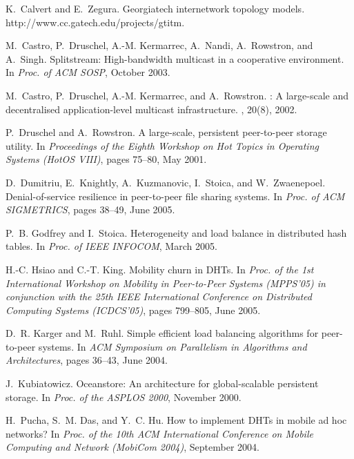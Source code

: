 \documentclass{sig-alt-release}
\begin{document}

\begin{thebibliography}{10}

K.~Calvert and E.~Zegura.
\newblock Georgiatech internetwork topology models.
\newblock http://www.cc.gatech.edu/projects/gtitm.

M.~Castro, P.~Druschel, A.-M. Kermarrec, A.~Nandi, A.~Rowstron, and
A.~Singh.
\newblock Splitstream: High-bandwidth multicast in a cooperative environment.
\newblock In {\em Proc. of ACM SOSP}, October 2003.

M.~Castro, P.~Druschel, A.-M. Kermarrec, and A.~Rowstron.
: A large-scale and decentralised application-level multicast
  infrastructure.
, 20(8), 2002.

P.~Druschel and A.~Rowstron.
\newblock A large-scale, persistent peer-to-peer storage utility.
\newblock In {\em Proceedings of the Eighth Workshop on Hot Topics in Operating
  Systems (HotOS VIII)}, pages 75--80, May 2001.

D.~Dumitriu, E.~Knightly, A.~Kuzmanovic, I.~Stoica, and
W.~Zwaenepoel.
\newblock Denial-of-service resilience in peer-to-peer file sharing systems.
\newblock In {\em Proc. of ACM SIGMETRICS}, pages 38--49, June 2005.

P.~B. Godfrey and I.~Stoica.
\newblock Heterogeneity and load balance in distributed hash tables.
\newblock In {\em Proc. of IEEE INFOCOM}, March 2005.

H.-C. Hsiao and C.-T. King.
\newblock Mobility churn in {DHT}s.
\newblock In {\em Proc. of the 1st International Workshop on Mobility in
  Peer-to-Peer Systems (MPPS'05) in conjunction with the 25th IEEE
  International Conference on Distributed Computing Systems (ICDCS'05)}, pages
  799--805, June 2005.

D.~R. Karger and M.~Ruhl.
\newblock Simple efficient load balancing algorithms for peer-to-peer systems.
\newblock In {\em ACM Symposium on Parallelism in Algorithms and
  Architectures}, pages 36--43, June 2004.

J.~Kubiatowicz.
\newblock Oceanstore: An architecture for global-scalable persistent storage.
\newblock In {\em Proc. of the ASPLOS 2000}, November 2000.

H.~Pucha, S.~M. Das, and Y.~C. Hu.
\newblock How to implement {DHT}s in mobile ad hoc networks?
\newblock In {\em Proc. of the 10th ACM International Conference on Mobile
  Computing and Network (MobiCom 2004)}, September 2004.


\end{thebibliography}
\end{document}
